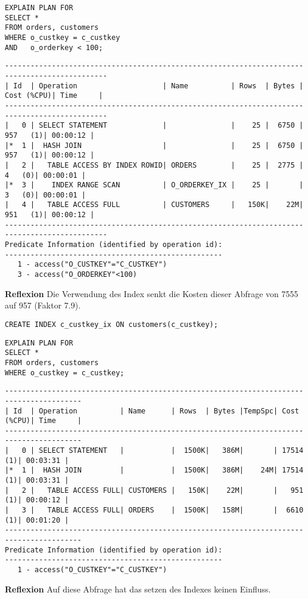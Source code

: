\documentclass[10pt]{article}
\begin{document}
\begin{lstlisting}[style=sql]
EXPLAIN PLAN FOR
SELECT *
FROM orders, customers
WHERE o_custkey = c_custkey
AND   o_orderkey < 100;
\end{lstlisting}
\begin{lstlisting}[style=queryexecutionplan]
----------------------------------------------------------------------------------------------
| Id  | Operation                    | Name          | Rows  | Bytes | Cost (%CPU)| Time     |
----------------------------------------------------------------------------------------------
|   0 | SELECT STATEMENT             |               |    25 |  6750 |   957   (1)| 00:00:12 |
|*  1 |  HASH JOIN                   |               |    25 |  6750 |   957   (1)| 00:00:12 |
|   2 |   TABLE ACCESS BY INDEX ROWID| ORDERS        |    25 |  2775 |     4   (0)| 00:00:01 |
|*  3 |    INDEX RANGE SCAN          | O_ORDERKEY_IX |    25 |       |     3   (0)| 00:00:01 |
|   4 |   TABLE ACCESS FULL          | CUSTOMERS     |   150K|    22M|   951   (1)| 00:00:12 |
----------------------------------------------------------------------------------------------
Predicate Information (identified by operation id):
---------------------------------------------------
   1 - access("O_CUSTKEY"="C_CUSTKEY")
   3 - access("O_ORDERKEY"<100)
\end{lstlisting}
\textbf{Reflexion} \newline
Die Verwendung des Index senkt die Kosten dieser Abfrage von 7555 auf 957 (Faktor 7.9).
\begin{lstlisting}[style=sql]
CREATE INDEX c_custkey_ix ON customers(c_custkey);
\end{lstlisting}
\begin{lstlisting}[style=sql]
EXPLAIN PLAN FOR
SELECT *
FROM orders, customers
WHERE o_custkey = c_custkey;
\end{lstlisting}
\begin{lstlisting}[style=queryexecutionplan]
----------------------------------------------------------------------------------------
| Id  | Operation          | Name      | Rows  | Bytes |TempSpc| Cost (%CPU)| Time     |
----------------------------------------------------------------------------------------
|   0 | SELECT STATEMENT   |           |  1500K|   386M|       | 17514   (1)| 00:03:31 |
|*  1 |  HASH JOIN         |           |  1500K|   386M|    24M| 17514   (1)| 00:03:31 |
|   2 |   TABLE ACCESS FULL| CUSTOMERS |   150K|    22M|       |   951   (1)| 00:00:12 |
|   3 |   TABLE ACCESS FULL| ORDERS    |  1500K|   158M|       |  6610   (1)| 00:01:20 |
----------------------------------------------------------------------------------------
Predicate Information (identified by operation id):
---------------------------------------------------
   1 - access("O_CUSTKEY"="C_CUSTKEY")
\end{lstlisting}
\textbf{Reflexion} \newline
Auf diese Abfrage hat das setzen des Indexes keinen Einfluss.
\end{document}
